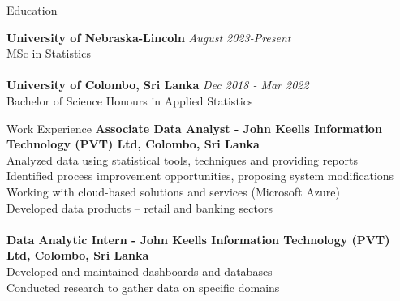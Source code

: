 \documentclass{resume} %
\begin{document}

\begin{rSection}{Education}


{\bf University of Nebraska-Lincoln} \hfill {\em August 2023-Present} 
\\ MSc in Statistics\\
\\{\bf University of Colombo, Sri Lanka} \hfill {\em Dec 2018 - Mar 2022} 
\\ Bachelor of Science Honours in Applied Statistics\\


\end{rSection}
\begin{rSection}{Work Experience}
{\bf Associate Data Analyst - John Keells Information Technology (PVT) Ltd, Colombo, Sri Lanka }
\\Analyzed data using statistical tools, techniques and providing reports\\
Identified process improvement opportunities, proposing system modifications\\
Working with cloud-based solutions and services (Microsoft Azure)\\
Developed data products – retail and banking sectors
\\
\\{\bf Data Analytic Intern - John Keells Information Technology (PVT) Ltd, Colombo, Sri Lanka }\\
Developed and maintained dashboards and databases   \\
Conducted research to gather data on specific domains

\end{rSection}
\end{document}
